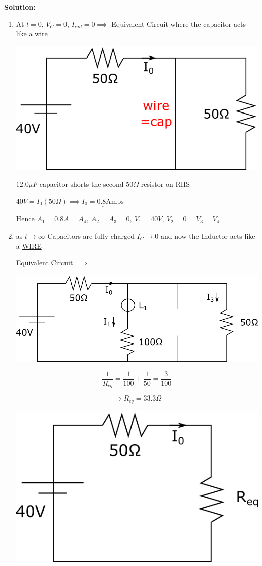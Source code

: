 \textbf{Solution:}\\
\begin{enumerate}
	\item At $t=0$, $V_C=0$, $I_{ind}=0 \implies$ Equivalent Circuit where the capacitor acts like a wire
	
	\vspace{5mm}
	\includegraphics[width=0.4\linewidth]{Images/P11img2.png}
	\vspace{5mm}
	
	$12.0\mu F$ capacitor shorts the second $50\Omega$ resistor on RHS
	
	$40V=I_0(50\Omega)\implies \underline{I_0=0.8\textrm{Amps}}$
	
	Hence $A_1=0.8A=A_4, \: A_2=A_3=0, \: V_1=40V, \: V_2=0=V_3=V_4$
	
	\item as $t\rightarrow \infty$ Capacitors are fully charged $I_C\rightarrow 0$ and now the Inductor acts like a \underline{WIRE}
	\vspace{5mm}
	
	Equivalent Circuit $\implies$
	
	\vspace{5mm}
	\includegraphics[width=0.6\linewidth]{Images/P11img3.png}
	
	$$\frac{1}{R_{eq}}=\frac{1}{100}+\frac{1}{50}=\frac{3}{100}$$
	
	$$\rightarrow R_{eq}=33.3\Omega$$
	
	\vspace{5mm}
	\includegraphics[width=0.35\linewidth]{Images/P11img4.png}
	\vspace{5mm}
	

\end{enumerate}
